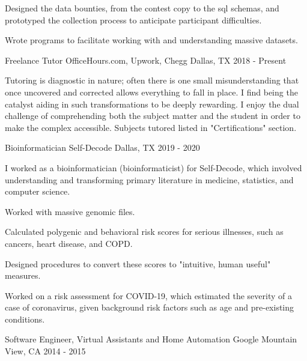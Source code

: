 \begin{cventries}
{\begin{cvitems}
                \item{Designed the data bounties, from the contest copy to the sql schemas, and prototyped the collection process to anticipate participant difficulties.}
                \item{Wrote programs to facilitate working with and understanding massive datasets.}
            \end{cvitems}
        }
    \cventry
        {Freelance Tutor}
        {OfficeHours.com, Upwork, Chegg}
        {Dallas, TX}
        {2018 - Present}
        {
            \begin{cvparagraph}
                Tutoring is diagnostic in nature; often there is one small misunderstanding that once uncovered and corrected allows everything to fall in place. I find being the catalyst aiding in such transformations to be deeply rewarding. I enjoy the dual challenge of comprehending both the subject matter and the student in order to make the complex accessible. Subjects tutored listed in "Certifications" section.
            \end{cvparagraph}
        }
    \cventry
        {Bioinformatician}
        {Self-Decode}
        {Dallas, TX}
        {2019 - 2020}
        {
            \begin{cvparagraph}
            I worked as a bioinformatician (bioinformaticist) for Self-Decode, which involved understanding and transforming primary literature in medicine, statistics, and computer science. 
            \end{cvparagraph}
            \begin{cvitems}
                \item{Worked with massive genomic files.}
                \item{Calculated polygenic and behavioral risk scores for serious illnesses, such as cancers, heart disease, and COPD.}
                \item{Designed procedures to convert these scores to "intuitive, human useful" measures.}
                \item{Worked on a risk assessment for COVID-19, which estimated the severity of a case of coronavirus, given background risk factors such as age and pre-existing conditions.}
            \end{cvitems}
        }
    \cventry
        {Software Engineer, Virtual Assistants and Home Automation}
        {Google}
        {Mountain View, CA}
        {2014 - 2015}
        {
        \begin{cvparagraph}

\end{cvparagraph}}
\end{cventries}
